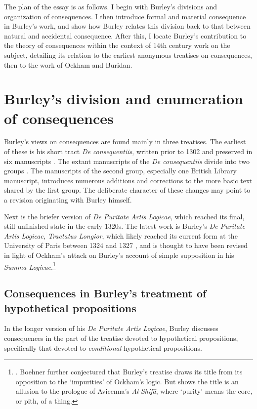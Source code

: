\documentclass[]{birkjour}
\begin{document}
The plan of the essay is as follows. I begin with Burley's divisions and organization of consequences. I then introduce formal and material consequence in Burley's work, and show how Burley relates this division back to that between natural and accidental consequence. After this, I locate Burley's contribution to the theory of consequences within the context of 14th century work on the subject, detailing its relation to the earliest anonymous treatises on consequences, then to the work of Ockham and Buridan. 
\section{Burley's division and enumeration of consequences}
Burley's views on consequences are found mainly in three treatises. The earliest of these is his short tract \textit{De consequentiis}, written prior to 1302 and preserved in six manuscripts \autocite{Green-Pedersen1980b}. The extant manuscripts of the \textit{De consequentiis} divide into two groups \autocite[pp. 104-105]{Green-Pedersen1980b}. The manuscripts of the second group, especially one British Library manuscript, introduces numerous additions and corrections to the more basic text shared by the first group. The deliberate character of these changes may point to a revision originating with Burley himself.

Next is the briefer version of \textit{De Puritate Artis Logicae}, which reached its final, still unfinished state in the early 1320s. The latest work is Burley's \textit{De Puritate Artis Logicae, Tractatus Longior}, which likely reached its current form at the University of Paris between 1324 and 1327 \autocite[pp. 12-13]{Ottman1999}, and is thought to have been revised in light of Ockham's attack on Burley's account of simple supposition in his \textit{Summa Logicae}.\footnote{\autocite[pp. vii-viii]{Boehner1955}. Boehner further conjectured that Burley's treatise draws its title from its opposition to the `impurities' of Ockham's logic. But \autocite{SpadeMenn} shows the title is an allusion to the prologue of Avicenna's \textit{Al-Shif\={a}}, where `purity' means the core, or pith, of a thing.}
\subsection{Consequences in Burley's treatment of hypothetical propositions}
In the longer version of his \textit{De Puritate Artis Logicae}, Burley discusses consequences in the part of the treatise devoted to hypothetical propositions, specifically that devoted to \textit{conditional} hypothetical propositions.
	
\end{document}
